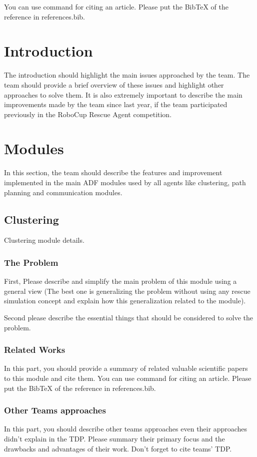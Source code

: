 \documentclass[runningheads,a4paper]{llncs}
\begin{document}
You can use command \cite{ref1} for citing an article. Please put the  BibTeX of the reference in references.bib.


\section{Introduction}
The introduction should highlight the main issues approached by the team. The
team should provide a brief overview of these issues and highlight other
approaches to solve them. It is also extremely important to describe the main
improvements made by the team since last year, if the team participated
previously in the RoboCup Rescue Agent competition.
\section{Modules}
In this section, the team should describe the features and improvement
implemented in the main ADF modules used by all agents like clustering, path
planning and communication modules.
\subsection{Clustering}
Clustering module details.
\subsubsection{The Problem}
First, Please describe and simplify the main problem of this module using a general view (The best one is generalizing the problem without using any rescue simulation concept and explain how this generalization related to the module).

Second please describe the essential things that should be considered to solve the problem.
\subsubsection{Related Works}
In this part, you should provide a summary of related valuable scientific papers to this module and cite them. You can use command \cite{ref1} for citing an article. Please put the BibTeX of the reference in references.bib. 
\subsubsection{Other Teams approaches}
In this part, you should describe other teams approaches even their approaches didn't explain in the TDP. Please summary their primary focus and the drawbacks and advantages of their work. Don't forget to cite teams' TDP.
\end{document}
